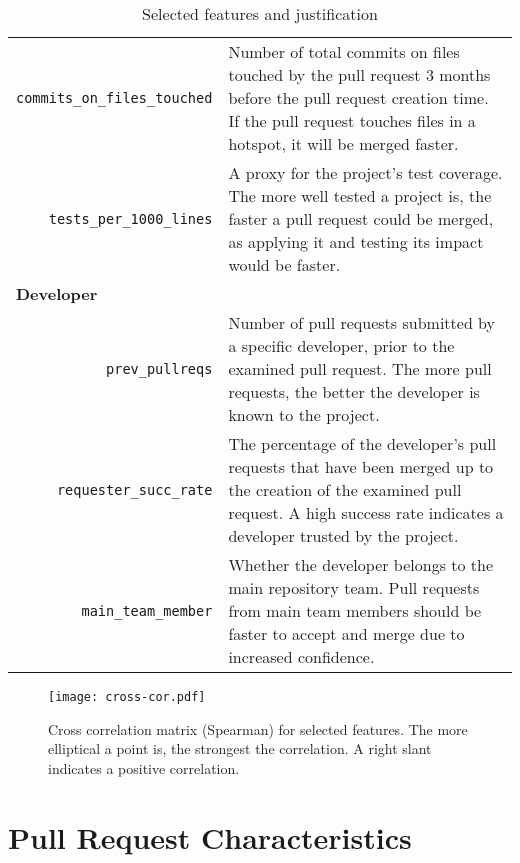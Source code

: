 \documentclass{acm_proc_article-sp}
\begin{document}
\begin{table*}
\begin{small}
\begin{tabular}{rp{40em}}
    \texttt{commits\_on\_files\_touched} & Number of total commits on files
    touched by the pull request 3 months before the pull request creation time.
    If the pull request touches files in a hotspot, it will be merged faster.\\
 
    \texttt{tests\_per\_1000\_lines} & A proxy for the project's test
    coverage. The more well tested a project is, the faster a pull request
    could be merged, as applying it and testing its impact would be faster. \\

    \multicolumn{2}{l}{\bf{Developer}}\\
    
    \texttt{prev\_pullreqs} & Number of pull requests submitted by a specific
    developer, prior to the examined pull request. The more pull requests, the
    better the developer is known to the project.\\

    \texttt{requester\_succ\_rate} & The percentage of the developer's pull requests that have been merged up to the creation of the examined pull
    request. A high success rate indicates a developer trusted by the project.\\

    \texttt{main\_team\_member} & Whether the developer belongs to the
    main repository team. Pull requests from main team members should be
    faster to accept and merge due to increased confidence.\\
    \hline
  \end{tabular}
  \caption{Selected features and justification}
  \label{tab:features}
  \end{small}
\end{table*}


\begin{figure}
  \begin{center}
    \texttt{[image: cross-cor.pdf]}
  \end{center}
  \caption{Cross correlation matrix (Spearman) for selected features. The more elliptical a point is, the strongest the correlation. A right slant indicates
  a positive correlation.}
  \label{fig:crosscor}
\end{figure}

\section{Pull Request Characteristics}
\end{document}
